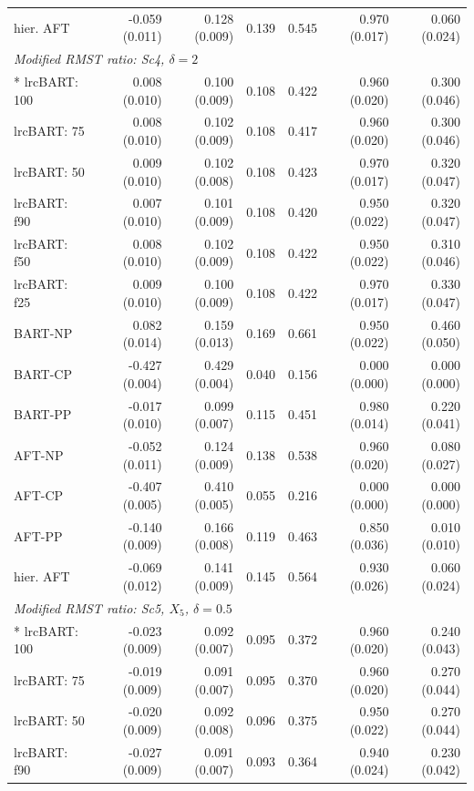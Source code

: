 \begin{landscape}
\begin{longtable}{lrrrrrr}
hier. AFT & -0.059 (0.011) & 0.128 (0.009) & 0.139 & 0.545 & 0.970 (0.017) & 0.060 (0.024) \\
\multicolumn{7}{l}{\strut\textit{Modified RMST ratio: Sc4, $\delta=2$}}\\*
lrcBART: 100 & 0.008 (0.010) & 0.100 (0.009) & 0.108 & 0.422 & 0.960 (0.020) & 0.300 (0.046) \\
lrcBART: 75 & 0.008 (0.010) & 0.102 (0.009) & 0.108 & 0.417 & 0.960 (0.020) & 0.300 (0.046) \\
lrcBART: 50 & 0.009 (0.010) & 0.102 (0.008) & 0.108 & 0.423 & 0.970 (0.017) & 0.320 (0.047) \\
lrcBART: f90 & 0.007 (0.010) & 0.101 (0.009) & 0.108 & 0.420 & 0.950 (0.022) & 0.320 (0.047) \\
lrcBART: f50 & 0.008 (0.010) & 0.102 (0.009) & 0.108 & 0.422 & 0.950 (0.022) & 0.310 (0.046) \\
lrcBART: f25 & 0.009 (0.010) & 0.100 (0.009) & 0.108 & 0.422 & 0.970 (0.017) & 0.330 (0.047) \\
BART-NP & 0.082 (0.014) & 0.159 (0.013) & 0.169 & 0.661 & 0.950 (0.022) & 0.460 (0.050) \\
BART-CP & -0.427 (0.004) & 0.429 (0.004) & 0.040 & 0.156 & 0.000 (0.000) & 0.000 (0.000) \\
BART-PP & -0.017 (0.010) & 0.099 (0.007) & 0.115 & 0.451 & 0.980 (0.014) & 0.220 (0.041) \\
AFT-NP & -0.052 (0.011) & 0.124 (0.009) & 0.138 & 0.538 & 0.960 (0.020) & 0.080 (0.027) \\
AFT-CP & -0.407 (0.005) & 0.410 (0.005) & 0.055 & 0.216 & 0.000 (0.000) & 0.000 (0.000) \\
AFT-PP & -0.140 (0.009) & 0.166 (0.008) & 0.119 & 0.463 & 0.850 (0.036) & 0.010 (0.010) \\
hier. AFT & -0.069 (0.012) & 0.141 (0.009) & 0.145 & 0.564 & 0.930 (0.026) & 0.060 (0.024) \\
\multicolumn{7}{l}{\strut\textit{Modified RMST ratio: Sc5, $X_5$, $\delta=0.5$}}\\*
lrcBART: 100 & -0.023 (0.009) & 0.092 (0.007) & 0.095 & 0.372 & 0.960 (0.020) & 0.240 (0.043) \\
lrcBART: 75 & -0.019 (0.009) & 0.091 (0.007) & 0.095 & 0.370 & 0.960 (0.020) & 0.270 (0.044) \\
lrcBART: 50 & -0.020 (0.009) & 0.092 (0.008) & 0.096 & 0.375 & 0.950 (0.022) & 0.270 (0.044) \\
lrcBART: f90 & -0.027 (0.009) & 0.091 (0.007) & 0.093 & 0.364 & 0.940 (0.024) & 0.230 (0.042) \\

\end{longtable}
\end{landscape}
